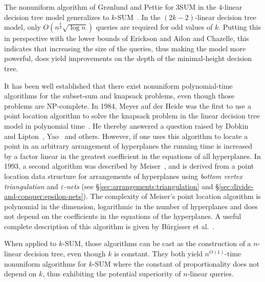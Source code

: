 The nonuniform algorithm of Gr\o nlund and
Pettie for 3SUM in the \(4\)-linear decision tree model
generalizes to \(k\)-SUM~\cite{GP18}.
In the $(2k-2)$-linear decision tree model,
only $O(n^\frac{k}{2}\sqrt{\log n})$ queries are required for odd values of $k$.
Putting this in perspective with the lower bounds of Erickson and Ailon and
Chazelle, this indicates that increasing the size of the queries, thus making
the model more powerful, does yield
improvements on the depth of the minimal-height decision tree.

It has been well established that there exist nonuniform
polynomial-time algorithms for the subset-sum and knapsack problems, even
though those problems are \textsc{NP}-complete.
%
In 1984,
Meyer auf der Heide was the first to use a point location algorithm to solve
the knapsack problem in the linear decision tree model in polynomial time~\cite{Mey84}.
He
thereby answered a question raised by Dobkin and Lipton~\cite{DL74,DL78},
Yao~\cite{Y82} and others. However, if one uses this algorithm to locate a
point in an arbitrary arrangement of hyperplanes the running time is increased
by a factor linear in the greatest coefficient in the equations of all
hyperplanes.
%
In 1993,
a second algorithm was described by Meiser~\cite{Mei93}, and is derived from a
point location data structure for arrangements of hyperplanes using
\emph{bottom vertex triangulation} and \emph{\(\varepsilon\)-nets} (see
\S\ref{sec:arrangements:triangulation} and
\S\ref{sec:divide-and-conquer:epsilon-nets}).
%
The complexity of Meiser's point location algorithm is polynomial in the
dimension, logarithmic in the number of hyperplanes and does not depend on the
coefficients in the equations of the hyperplanes. A useful
complete description of this algorithm is given by Bürgisser et
al.~\cite[Section~3.4]{BCS97}.

When applied to \(k\)-SUM, those algorithms can be cast as the construction of
a \(n\)-linear decision tree, even though \(k\) is constant.
They both yield \(n^{O(1)}\)-time nonuniform algorithms for
\(k\)-SUM where the constant of proportionality does not depend on \(k\), thus
exhibiting the potential superiority of $n$-linear queries.
